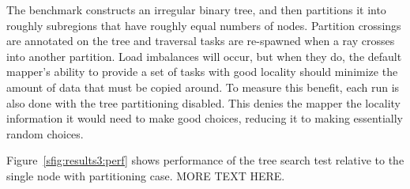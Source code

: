 The benchmark constructs an irregular binary tree, and then partitions it into
roughly subregions that have roughly equal numbers of nodes.  Partition
crossings are annotated on the tree and traversal tasks are re-spawned when
a ray crosses into another partition.  Load imbalances will occur, but when
they do, the default mapper's ability to provide a set of tasks with good
locality should minimize the amount of data that must be copied around.  To
measure this benefit, each run is also done with the tree partitioning 
disabled.  This denies the mapper the locality information it would need to 
make good choices, reducing it to making essentially random choices.

Figure~\ref{sfig:results3:perf} shows performance of the tree search test
relative to the single node with partitioning case. MORE TEXT HERE.

